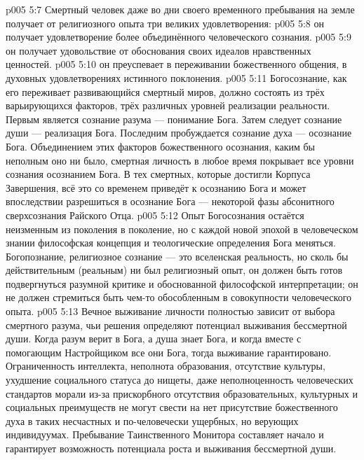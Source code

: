 \vs p005 5:7 \pc Смертный человек даже во дни своего временного пребывания на земле получает от религиозного опыта три великих удовлетворения:
\vs p005 5:8  он получает удовлетворение более объединённого человеческого сознания.
\vs p005 5:9  он получает удовольствие от обоснования своих идеалов нравственных ценностей.
\vs p005 5:10  он преуспевает в переживании божественного общения, в духовных удовлетворениях истинного поклонения.
\vs p005 5:11 \pc Богосознание, как его переживает развивающийся смертный миров, должно состоять из трёх варьирующихся факторов, трёх различных уровней реализации реальности. Первым является сознание разума --- понимание  Бога. Затем следует сознание души --- реализация  Бога. Последним пробуждается сознание духа --- осознание  Бога. Объединением этих факторов божественного осознания, каким бы неполным оно ни было, смертная личность в любое время покрывает все уровни сознания осознанием  Бога. В тех смертных, которые достигли Корпуса Завершения, всё это со временем приведёт к осознанию  Бога и может впоследствии разрешиться в осознание  Бога --- некоторой фазы абсонитного сверхсознания Райского Отца.
\vs p005 5:12 Опыт Богосознания остаётся неизменным из поколения в поколение, но с каждой новой эпохой в человеческом знании философская концепция и теологические определения Бога  меняться. Богопознание, религиозное сознание --- это вселенская реальность, но сколь бы действительным (реальным) ни был религиозный опыт, он должен быть готов подвергнуться разумной критике и обоснованной философской интерпретации; он не должен стремиться быть чем\hyp{}то обособленным в совокупности человеческого опыта.
\vs p005 5:13 \pc Вечное выживание личности полностью зависит от выбора смертного разума, чьи решения определяют потенциал выживания бессмертной души. Когда разум верит в Бога, а душа знает Бога, и когда вместе с помогающим Настройщиком все они  Бога, тогда выживание гарантировано. Ограниченность интеллекта, неполнота образования, отсутствие культуры, ухудшение социального статуса до нищеты, даже неполноценность человеческих стандартов морали из\hyp{}за прискорбного отсутствия образовательных, культурных и социальных преимуществ не могут свести на нет присутствие божественного духа в таких несчастных и по\hyp{}человечески ущербных, но верующих индивидуумах. Пребывание Таинственного Монитора составляет начало и гарантирует возможность потенциала роста и выживания бессмертной души.
